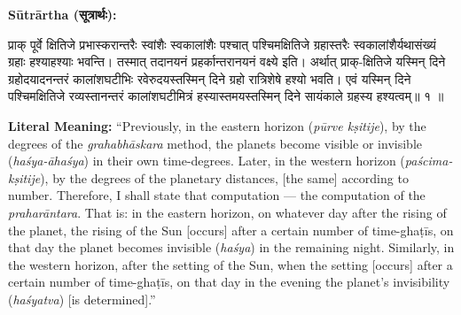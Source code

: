 \documentclass[11pt,a4paper]{article}
\newcommand{\dev}[1]{{\devanagarifont #1}}
\newenvironment{sanskritverse}{%
  \begin{center}\begin{minipage}{0.95\textwidth}
  \setlength{\leftskip}{1em}
  \setlength{\rightskip}{1em}
  \dev
}{\end{minipage}\end{center}}
\newenvironment{paracol}[1]{\begingroup}{\endgroup}
\newcommand{\switchcolumn}[1][]{%
  \ifnum#1=0\relax\else\par\nobreak\vspace{0.5em}\par\nobreak\fi%
}
\begin{document}
\begin{paracol}{2}

\noindent\textbf{Sūtrārtha (\dev{सूत्रार्थः}):}
\begin{sanskritverse}
प्राक् पूर्वे क्षितिजे प्रभास्करान्तरैः स्वांशैः स्वकालांशैः पश्चात् पश्चिमक्षितिजे
ग्रहास्तरैः स्वकालांशैर्यथासंख्यं ग्रहाः हश्याहश्याः भवन्ति। तस्मात् तदानयनं
प्रहर्कान्तरानयनं वक्ष्ये इति। अर्थात् प्राक्-क्षितिजे यस्मिन् दिने ग्रहोदयादनन्तरं
कालांशघटीभिः रवेरुदयस्तस्मिन् दिने ग्रहो रात्रिशेषे हश्यो भवति। एवं यस्मिन् दिने
पश्चिमक्षितिजे रव्यस्तानन्तरं कालांशघटीमित्रं हस्यास्तमयस्तस्मिन् दिने सायंकाले
ग्रहस्य हश्यत्वम्॥ १ ॥
\end{sanskritverse}

\switchcolumn

\textbf{Literal Meaning:} ``Previously, in the eastern horizon (\textit{pūrve kṣitije}), by the degrees of the \textit{grahabhāskara} method, the planets become visible or invisible (\textit{haśya-āhaśya}) in their own time-degrees. Later, in the western horizon (\textit{paścima-kṣitije}), by the degrees of the planetary distances, [the same] according to number. Therefore, I shall state that computation --- the computation of the \textit{praharāntara}. That is: in the eastern horizon, on whatever day after the rising of the planet, the rising of the Sun [occurs] after a certain number of time-ghaṭīs, on that day the planet becomes invisible (\textit{haśya}) in the remaining night. Similarly, in the western horizon, after the setting of the Sun, when the setting [occurs] after a certain number of time-ghaṭīs, on that day in the evening the planet's invisibility (\textit{haśyatva}) [is determined].''

\end{paracol}

\vspace{0.5em}
\end{document}
